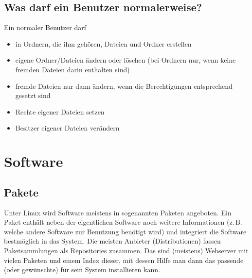 \documentclass[a4paper,12pt]{article}
\begin{document}
\subsection{Was darf ein Benutzer normalerweise?}
Ein normaler Benutzer darf 
\begin{itemize}
\item in Ordnern, die ihm gehören, Dateien und Ordner erstellen
\item eigene Ordner/Dateien ändern oder löschen (bei Ordnern nur, wenn 
keine fremden Dateien darin enthalten sind)
\item fremde Dateien nur dann ändern, wenn die Berechtigungen entsprechend gesetzt sind
\item Rechte eigener Dateien setzen
\item Besitzer eigener Dateien verändern
\end{itemize}

\section{Software}
\label{sec:Software}
\subsection{Pakete}
Unter Linux wird Software meistens in sogenannten Paketen angeboten. 
Ein Paket enthält neben der eigentlichen Software noch weitere 
Informationen (z.\,B. welche andere Software zur Benutzung benötigt wird) 
und integriert die Software bestmöglich in das System. Die meisten 
Anbieter (Distributionen) fassen Paketsammlungen als Repositories zusammen. 
Das sind (meistens) Webserver mit vielen Paketen und einem Index dieser, 
mit dessen Hilfe man dann das passende (oder gewünschte) für sein System
installieren kann.
\end{document}
